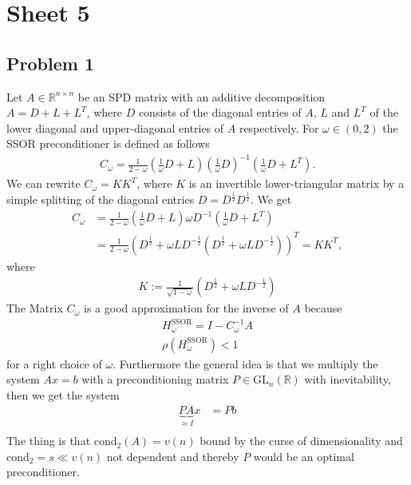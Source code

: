 


\maketitle
\tableofcontents
\section{Sheet 5}
\subsection{Problem 1}
Let $A \in \mathbb{R}^{n \times n}$ be an SPD matrix with an additive
decomposition $A = D + L + L^T$, where $D$ consists of the diagonal entries
of $A$, $L$ and $L^T$ of the lower diagonal and upper-diagonal entries of $A$
respectively. For $\omega \in(0,2)$ the SSOR preconditioner is defined as
follows
\begin{align}
    C_\omega = \frac{1}{2-\omega}\left( \frac{1}{\omega} D+L\right)
    \left( \frac{1}{\omega} D \right)^{-1}\left( \frac{1}{\omega}D + L^T
    \right).
\end{align}
We can rewrite $C_\omega = KK^T$, where $K$ is an invertible lower-triangular
matrix by a simple splitting of the diagonal entries $D =
D^{\frac{1}{2}}D^{\frac{1}{2}}$. We get
\begin{align}
    C_\omega &= \frac{1}{2-\omega}\left( \frac{1}{\omega}D +L \right)\omega
    D^{-1}\left( \frac{1}{\omega}D + L^T \right)  \\
    &= \frac{1}{2-\omega}\left( D^{\frac{1}{2}} + \omega
    LD^{-\frac{1}{2}}\left( D^{\frac{1}{2}}+\omega LD^{-\frac{1}{2}} \right)
\right)^T = KK^T,
\end{align}
where
\begin{align}
    K := \frac{1}{\sqrt{1-\omega} }\left( D^{\frac{1}{2}} + \omega LD^{-
    \frac{1}{2}} \right)
\end{align}
The Matrix $C_\omega$ is a good approximation for the inverse of $A$ because
\begin{align}
    H^{\text{SSOR}}_\omega = I - C^{-1}_\omega A\\
    \rho(H^{\text{SSOR}}_\omega) < 1
\end{align}
for a right choice of $\omega$. Furthermore the general idea is that we
multiply the system $Ax=b$ with a preconditioning matrix $P \in
\text{GL}_n\left(\mathbb{R}\right)$ with inevitability, then we get the
system
\begin{align}
    \underbrace{PA}_{\approx I}x&= Pb\\
\end{align}
The thing is that $\text{cond}_2(A) = v(n)$ bound by the curse of
dimensionality and $\text{cond}_2 = s \ll v(n)$ not dependent and thereby $P$
would be an optimal preconditioner.
